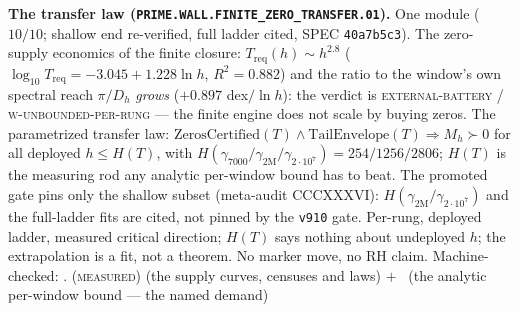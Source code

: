 \par\smallskip\noindent\textbf{The transfer law
(\texttt{PRIME.WALL.FINITE\_ZERO\_\allowbreak TRANSFER.01}).}
One module ($10/10$; shallow end re-verified, full ladder
cited, SPEC \texttt{40a7b5c3}).  The zero-supply economics of
the finite closure: $T_{\mathrm{req}}(h) \sim h^{2.8}$
($\log_{10} T_{\mathrm{req}} = -3.045 + 1.228 \ln h$, $R^2 =
0.882$) and the ratio to the window's own spectral reach
$\pi/D_h$ \emph{grows} ($+0.897$ dex$/\ln h$): the verdict is
\textsc{external-battery} / \textsc{w-unbounded-per-rung} ---
the finite engine does not scale by buying zeros.  The
parametrized transfer law:
$\mathrm{ZerosCertified}(T) \wedge \mathrm{TailEnvelope}(T)
\Rightarrow M_h \succ 0$ for all deployed $h \le H(T)$, with
$H(\gamma_{7000}/\gamma_{2\mathrm{M}}/\gamma_{2\cdot10^{7}}) =
254/1256/2806$; $H(T)$ is the measuring rod any analytic
per-window bound has to beat.  The promoted gate pins only the
shallow subset (meta-audit CCCXXXVI):
$H(\gamma_{2\mathrm{M}}/\gamma_{2\cdot10^{7}})$ and the
full-ladder fits are cited, not pinned by the \texttt{v910}
gate.  Per-rung, deployed ladder,
measured critical direction; $H(T)$ says nothing about
undeployed $h$; the extrapolation is a fit, not a theorem.  No
marker move, no RH claim.
Machine-checked: .
(\textsc{measured}) (the supply curves, censuses and laws) $+$
\mO\ (the analytic per-window bound --- the named demand)
\par\smallskip


